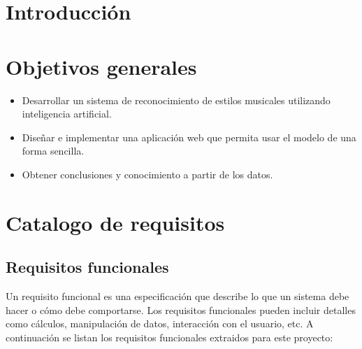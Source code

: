 
\section{Introducción}

\section{Objetivos generales}

\begin{itemize}
\tightlist
\item Desarrollar un sistema de reconocimiento de estilos musicales utilizando inteligencia artificial.
\item Diseñar e implementar una aplicación web que permita usar el modelo de una forma sencilla.
\item Obtener conclusiones y conocimiento a partir de los datos.
\end{itemize}

\section{Catalogo de requisitos}

\subsection{Requisitos funcionales}

Un requisito funcional es una especificación que describe lo que un sistema debe hacer o cómo debe comportarse.
Los requisitos funcionales pueden incluir detalles como cálculos, manipulación de datos, interacción con el usuario, etc.
A continuación se listan los requisitos funcionales extraidos para este proyecto:

